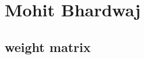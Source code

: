\documentclass[a4paper,fontsize=12pt]{scrartcl}
\begin{document}
\section*{Mohit Bhardwaj}
\subsection*{weight matrix}
\end{document}
